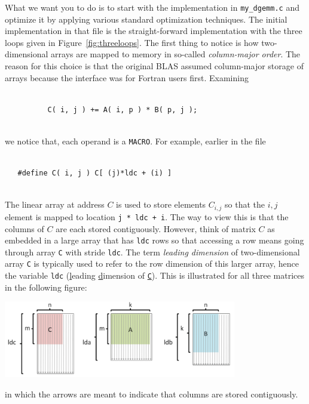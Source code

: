 What we want you to do is to start with the implementation in {\tt my\_dgemm.c} and optimize it by applying various standard optimization techniques.
The initial implementation in that file is the straight-forward implementation with the three loops given in Figure~\ref{fig:threeloops}.
The first thing to notice is how two-dimensional arrays are mapped to memory in so-called {\em column-major order}.  The reason for this choice is that the original BLAS assumed column-major storage of arrays because the interface was for Fortran users first.  
Examining
\begin{verbatim}

          C( i, j ) += A( i, p ) * B( p, j );
          
\end{verbatim}
we notice that, each operand is a {\tt MACRO}. For example, earlier in the file
\begin{verbatim}

   #define C( i, j ) C[ (j)*ldc + (i) ]
   
\end{verbatim}
The linear array at address $ C $ is used to store elements $ C_{i,j} $ so that the $ i,j $ element is mapped to location {\tt j * ldc + i}.  The way to view this is that the columns of $ C $ are each stored contiguously.  However, think of matrix $ C $ as embedded in a large array that has {\tt ldc} rows so that accessing a row means going through array {\tt C} with stride {\tt ldc}.  The term {\em leading dimension} of two-dimensional array {\tt C} is typically used to refer to the row dimension of this larger array, hence the variable {\tt ldc} (\underline{l}eading \underline{d}imension of \underline{\tt C}).
This is illustrated for all three matrices in
the following figure:
\begin{center}
	\includegraphics[width=4in]{figures/LeadingDims.pdf}
\end{center}
in which the arrows are meant to indicate that columns are stored contiguously.



